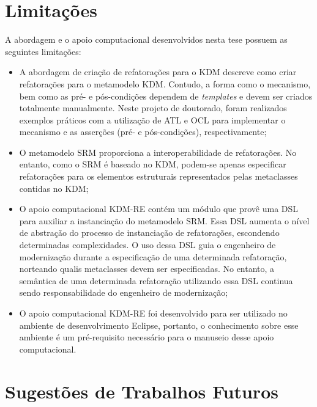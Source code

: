 \section{Limitações}\label{sec:limitacoes_trabalho}

A abordagem e o apoio computacional desenvolvidos nesta tese possuem as seguintes limitações:

\begin{itemize}

\item A abordagem de criação de refatorações para o KDM descreve como criar refatorações para o metamodelo KDM. Contudo, a forma como o mecanismo, bem como as pré- e pós-condições dependem de \textit{templates} e devem ser criados totalmente manualmente. Neste projeto de doutorado, foram realizados exemplos práticos com a utilização de ATL e OCL para implementar o mecanismo e as asserções (pré- e pós-condições), respectivamente;

\item O metamodelo SRM proporciona a interoperabilidade de refatorações. No entanto, como o SRM é baseado no KDM, podem-se apenas especificar refatorações para os elementos estruturais representados pelas metaclasses contidas no KDM;  


\item O apoio computacional KDM-RE contém um módulo que provê uma DSL para auxiliar a instanciação do metamodelo SRM. Essa DSL aumenta o nível de abstração do processo de instanciação de refatorações, escondendo determinadas complexidades. O uso dessa DSL guia o engenheiro de modernização durante a especificação de uma determinada refatoração, norteando qualis metaclasses devem ser especificadas. No entanto, a semântica de uma determinada refatoração utilizando essa DSL continua sendo responsabilidade do engenheiro de modernização;


\item O apoio computacional KDM-RE foi desenvolvido para ser utilizado no ambiente de desenvolvimento Eclipse, portanto, o conhecimento sobre esse ambiente é um pré-requisito necessário para o manuseio desse apoio computacional.
\end{itemize}

\section{Sugestões de Trabalhos Futuros}\label{sec:trabalhos_futuros_tese}

